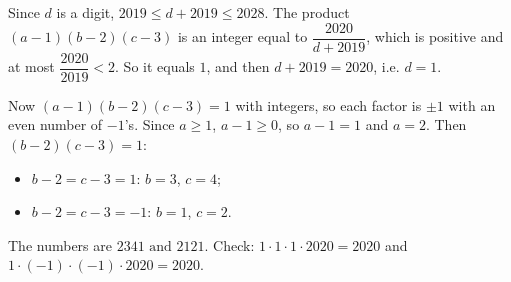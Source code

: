 Since $d$ is a digit, $2019\le d+2019\le2028$. The product $(a-1)(b-2)(c-3)$ is an integer equal to $\dfrac{2020}{d+2019}$, which is positive and at most $\dfrac{2020}{2019}<2$. So it equals $1$, and then $d+2019=2020$, i.e. $d=1$.

Now $(a-1)(b-2)(c-3)=1$ with integers, so each factor is $\pm1$ with an even number of $-1$'s. Since $a\ge1$, $a-1\ge0$, so $a-1=1$ and $a=2$. Then $(b-2)(c-3)=1$:
\begin{itemize}
\item $b-2=c-3=1$: $b=3$, $c=4$;
\item $b-2=c-3=-1$: $b=1$, $c=2$.
\end{itemize}
The numbers are $\boxed{2341\text{ and }2121}$. Check: $1\cdot1\cdot1\cdot2020=2020$ and $1\cdot(-1)\cdot(-1)\cdot2020=2020$.
